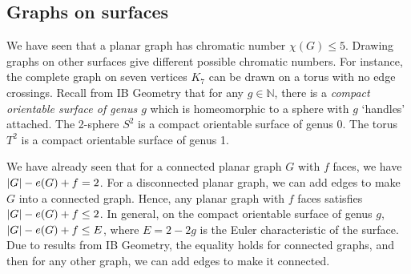 \subsection{Graphs on surfaces}
We have seen that a planar graph has chromatic number \( \chi(G) \leq 5 \).
Drawing graphs on other surfaces give different possible chromatic numbers.
For instance, the complete graph on seven vertices \( K_7 \) can be drawn on a torus with no edge crossings.
Recall from IB Geometry that for any \( g \in \mathbb N \), there is a \emph{compact orientable surface of genus \( g \)} which is homeomorphic to a sphere with \( g \) `handles' attached.
The 2-sphere \( S^2 \) is a compact orientable surface of genus 0.
The torus \( T^2 \) is a compact orientable surface of genus 1.

We have already seen that for a connected planar graph \( G \) with \( f \) faces, we have \( \abs{G} - e(G) + f = 2 \).
For a disconnected planar graph, we can add edges to make \( G \) into a connected graph.
Hence, any planar graph with \( f \) faces satisfies \( \abs{G} - e(G) + f \leq 2 \).
In general, on the compact orientable surface of genus \( g \), \( \abs{G} - e(G) + f \leq E \), where \( E = 2 - 2g \) is the Euler characteristic of the surface.
Due to results from IB Geometry, the equality holds for connected graphs, and then for any other graph, we can add edges to make it connected.


